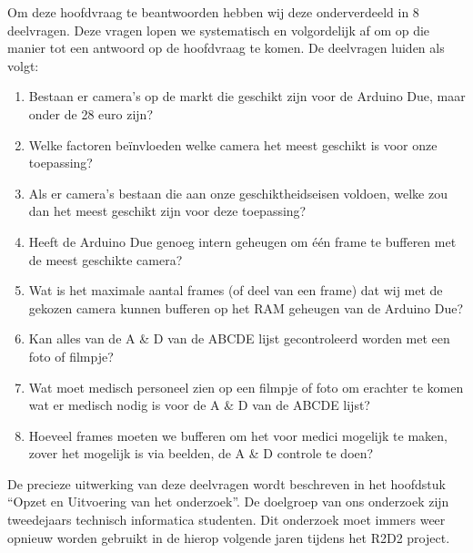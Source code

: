 \documentclass{article}
\begin{document}
Om deze hoofdvraag te beantwoorden hebben wij deze onderverdeeld in 8 deelvragen. Deze vragen lopen we systematisch en volgordelijk af om op die manier tot een antwoord op de hoofdvraag te komen. De deelvragen luiden als volgt:

\begin{enumerate}
	\item Bestaan er camera’s op de markt die geschikt zijn voor de Arduino Due, maar onder de 28 euro zijn?
	\item Welke factoren beïnvloeden welke camera het meest geschikt is voor onze toepassing? 
	\item Als er camera’s bestaan die aan onze geschiktheidseisen voldoen, welke zou dan het meest geschikt zijn voor deze toepassing? 
	\item Heeft de Arduino Due genoeg intern geheugen om één frame te bufferen met de meest geschikte camera? 
	\item Wat is het maximale aantal frames (of deel van een frame) dat wij met de gekozen camera kunnen bufferen op het RAM geheugen van de Arduino Due? 
	\item Kan alles van de A {\&} D van de ABCDE lijst gecontroleerd worden met een foto of filmpje? 
	\item Wat moet medisch personeel zien op een filmpje of foto om erachter te komen wat er medisch nodig is voor de A {\&} D van de ABCDE lijst? 
	\item Hoeveel frames moeten we bufferen om het voor medici mogelijk te maken, zover het mogelijk is via beelden, de A {\&} D controle te doen? 
\end{enumerate}
De precieze uitwerking van deze deelvragen wordt beschreven in het hoofdstuk “Opzet en Uitvoering van het onderzoek”.
De doelgroep van ons onderzoek zijn tweedejaars technisch informatica studenten. Dit onderzoek moet immers weer opnieuw worden gebruikt in de hierop volgende jaren tijdens het R2D2 project.

\end{document}
